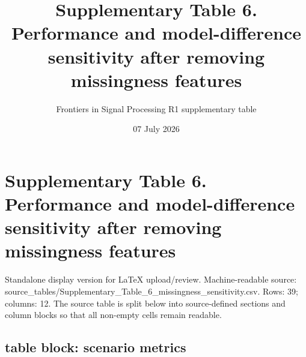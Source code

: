 \documentclass[11pt]{article}
\title{Supplementary Table 6. Performance and model-difference sensitivity after removing missingness features}
\author{Frontiers in Signal Processing R1 supplementary table}
\date{07 July 2026}
\begin{document}
\maketitle

\section*{Supplementary Table 6. Performance and model-difference sensitivity after removing missingness features}

Standalone display version for LaTeX upload/review. Machine-readable source: source\_\allowbreak{}tables/\allowbreak{}Supplementary\_\allowbreak{}Table\_\allowbreak{}6\_\allowbreak{}missingness\_\allowbreak{}sensitivity.\allowbreak{}csv. Rows: 39; columns: 12. The source table is split below into source-defined sections and column blocks so that all non-empty cells remain readable.

\subsection*{table block: scenario metrics}
\end{document}
